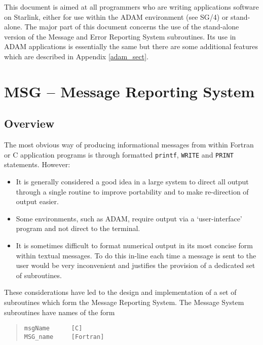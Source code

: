 \documentclass[twoside,11pt]{article}
\newcommand{\htmlref}[2]{#1}
\newcommand{\latex}[1]{#1}
\newcommand{\xref}[3]{#1}
\newcommand{\xlabel}[1]{}
\renewcommand{\_}{\texttt{\symbol{95}}}
\newcommand{\func}[1]{\texttt{#1}}
\begin{document}
This document is aimed at all programmers who are writing applications software
on Starlink, either for use within the
\xref{ADAM environment}{sg4}{}\latex{ (see SG/4)}
or stand-alone.
The major part of this document concerns the use of the stand-alone version of
the Message and Error Reporting System subroutines.
Its use in ADAM applications is essentially the same but there are some
\htmlref
{additional features}{adam_sect}\latex{ which are described in Appendix \ref{adam_sect}}.

\section{\xlabel{msg_message_reporting_system}MSG -- Message Reporting System \xlabel{msg}}

\subsection{\xlabel{overview}Overview}

The most obvious way of producing informational messages from within
Fortran or C application programs is through formatted \func{printf},
\func{WRITE} and \func{PRINT}
statements.
However:
\begin{itemize}
\item It is generally considered a good idea in a large system to direct
all output through a single routine to improve portability and to make
re-direction of output easier.
\item Some environments, such as ADAM, require output via a `user-interface'
program and not direct to the terminal.
\item It is sometimes difficult to format numerical output in its most
concise form within textual messages.
To do this in-line each time a message is sent to the user would be very
inconvenient and justifies the provision of a dedicated set of subroutines.
\end{itemize}
These considerations have led to the design and implementation of a set of
subroutines which form the Message Reporting System.
The Message System subroutines have names of the form

\begin {quote}
\begin {small}
\begin{verbatim}
msgName      [C]
MSG_name     [Fortran]
\end{verbatim}
\end {small}
\end {quote}
\end{document}
